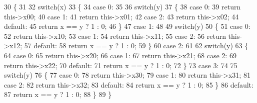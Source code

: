 \begin{DoxyCode}
30         \{
31 
32             \textcolor{keywordflow}{switch}(x)
33             \{
34                 \textcolor{keywordflow}{case} 0:
35 
36                     \textcolor{keywordflow}{switch}(y)
37                     \{
38                         \textcolor{keywordflow}{case} 0:
39                             \textcolor{keywordflow}{return} this->x00;
40                         \textcolor{keywordflow}{case} 1:
41                             \textcolor{keywordflow}{return} this->x01;
42                         \textcolor{keywordflow}{case} 2:
43                             \textcolor{keywordflow}{return} this->x02;
44                         \textcolor{keywordflow}{default}:
45                             \textcolor{keywordflow}{return} x == y ? 1 : 0;
46                     \}
47                 \textcolor{keywordflow}{case} 1:
48 
49                     \textcolor{keywordflow}{switch}(y)
50                     \{
51                         \textcolor{keywordflow}{case} 0:
52                             \textcolor{keywordflow}{return} this->x10;
53                         \textcolor{keywordflow}{case} 1:
54                             \textcolor{keywordflow}{return} this->x11;
55                         \textcolor{keywordflow}{case} 2:
56                             \textcolor{keywordflow}{return} this->x12;
57                         \textcolor{keywordflow}{default}:
58                             \textcolor{keywordflow}{return} x == y ? 1 : 0;
59                     \}
60                 \textcolor{keywordflow}{case} 2:
61 
62                     \textcolor{keywordflow}{switch}(y)
63                     \{
64                         \textcolor{keywordflow}{case} 0:
65                             \textcolor{keywordflow}{return} this->x20;
66                         \textcolor{keywordflow}{case} 1:
67                             \textcolor{keywordflow}{return} this->x21;
68                         \textcolor{keywordflow}{case} 2:
69                             \textcolor{keywordflow}{return} this->x22;
70                         \textcolor{keywordflow}{default}:
71                             \textcolor{keywordflow}{return} x == y ? 1 : 0;
72                     \}
73                 \textcolor{keywordflow}{case} 3:
74 
75                     \textcolor{keywordflow}{switch}(y)
76                     \{
77                         \textcolor{keywordflow}{case} 0:
78                             \textcolor{keywordflow}{return} this->x30;
79                         \textcolor{keywordflow}{case} 1:
80                             \textcolor{keywordflow}{return} this->x31;
81                         \textcolor{keywordflow}{case} 2:
82                             \textcolor{keywordflow}{return} this->x32;
83                         \textcolor{keywordflow}{default}:
84                             \textcolor{keywordflow}{return} x == y ? 1 : 0;
85                     \}
86                 \textcolor{keywordflow}{default}:
87                     \textcolor{keywordflow}{return} x == y ? 1 : 0;
88             \}
89         \}
\end{DoxyCode}
